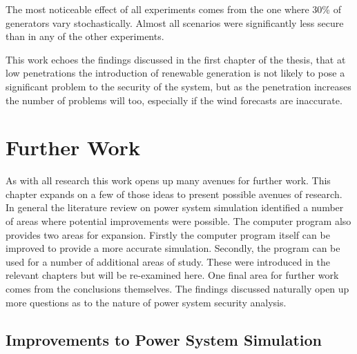 \documentclass[a4paper,oneside,12pt]{report}
\begin{document}
The most noticeable effect of all experiments comes from the one where 30\% of generators vary stochastically. Almost all scenarios were significantly less secure than in any of the other experiments. 

This work echoes the findings discussed in the first chapter of the thesis, that at low penetrations the introduction of renewable generation is not likely to pose a significant problem to the security of the system, but as the penetration increases the number of problems will too, especially if the wind forecasts are inaccurate.  










\chapter{Further Work}


As with all research this work opens up many avenues for further work. This chapter expands on a few of those ideas to present possible avenues of research. In general the literature review on power system simulation identified a number of areas where potential improvements were possible. The computer program also provides two areas for expansion. Firstly the computer program itself can be improved to provide a more accurate simulation. Secondly, the program can be used for a number of additional areas of study. These were introduced in the relevant chapters but will be re-examined here. One final area for further work comes from the conclusions themselves. The findings discussed naturally open up more questions as to the nature of power system security analysis.

\section{Improvements to Power System Simulation}
\end{document}
